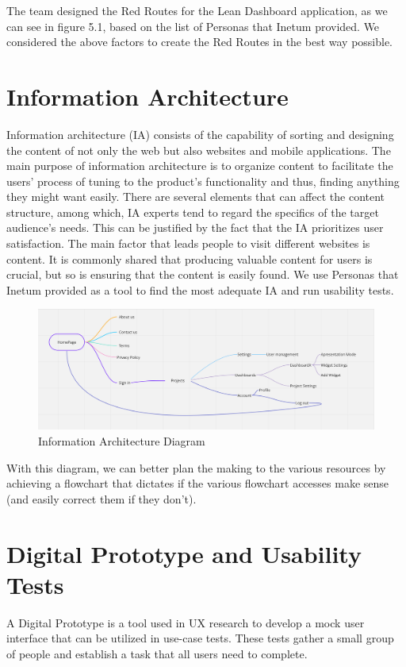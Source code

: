 \documentclass[a4paper,twoside,10pt]{report}
\begin{document}
The team designed the Red Routes for the Lean Dashboard application, as we can see in figure 5.1, based on the list of Personas that Inetum provided. We considered the above factors to create the Red Routes in the best way possible.
\newpage

\section{Information Architecture}
Information architecture (IA) consists of the capability of sorting and designing the content of not only the web but also websites and mobile applications. 
The main purpose of information architecture is to organize content to facilitate the users' process of tuning to the product's functionality and thus, finding anything they might want easily.
There are several elements that can affect the content structure, among which, IA experts tend to regard the specifics of the target audience's needs. This can be justified by the fact that the IA prioritizes user satisfaction.
The main factor that leads people to visit different websites is content. It is commonly shared that producing valuable content for users is crucial, but so is ensuring that the content is easily found. We use Personas that Inetum provided as a tool to find the most adequate IA and run usability tests.
 
\begin{figure}[h!]
\center
  \includegraphics[width=\textwidth]{information-architecture.png}
\caption{Information Architecture Diagram}
\end{figure}

With this diagram, we can better plan the making to the various resources by achieving a flowchart that dictates if the various flowchart accesses make sense (and easily correct them if they don't).

\newpage
\section{Digital Prototype and Usability Tests}
A Digital Prototype is a tool used in UX research to develop a mock user interface that can be utilized in use-case tests. These tests gather a small group of people and establish a task that all users need to complete. 
 
\end{document}
